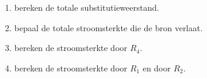 \documentclass[11pt, a4paper]{article}
\begin{document}
\begin{enumerate}[label=\alph*)]
    \item bereken de totale substitutieweerstand.
    \vspace{3.5cm} %
    \item bepaal de totale stroomsterkte die de bron verlaat.
    \vspace{3.5cm}
    \item bereken de stroomsterkte door $R_4$.
    \vspace{3.5cm}
    \item bereken de stroomsterkte door $R_1$ en door $R_2$.
    \vfill
\end{enumerate}
\end{document}
